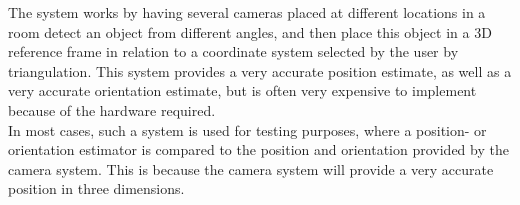 The system works by having several cameras placed at different locations in a room detect an object from different angles, and then place this object in a 3D reference frame in relation to a coordinate system selected by the user by triangulation. This system provides a very accurate position estimate, as well as a very accurate orientation estimate, but is often very expensive to implement because of the hardware required.\\

In most cases, such a system is used for testing purposes, where a position- or orientation estimator is compared to the position and orientation provided by the camera system. This is because the camera system will provide a very accurate position in three dimensions.
















